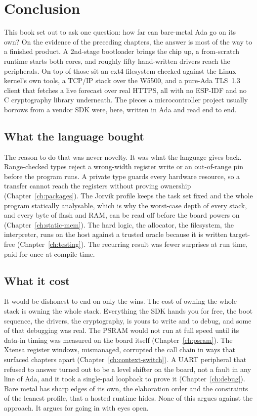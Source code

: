 \chapter*{Conclusion}
\label{ch:conclusion}

This book set out to ask one question: how far can bare-metal Ada go on its own? On
the evidence of the preceding chapters, the answer is most of the way to a finished
product. A 2nd-stage bootloader brings the chip up, a from-scratch runtime starts
both cores, and roughly fifty hand-written drivers reach the peripherals. On top of
those sit an ext4 filesystem checked against the Linux kernel's own tools, a TCP/IP
stack over the W5500, and a pure-Ada TLS~1.3 client that fetches a live forecast over
real HTTPS, all with no ESP-IDF and no C cryptography library underneath. The pieces
a microcontroller project usually borrows from a vendor SDK were, here, written in
Ada and read end to end.

\section*{What the language bought}

The reason to do that was never novelty. It was what the language gives back.
Range-checked types reject a wrong-width register write or an out-of-range pin before
the program runs. A private type guards every hardware resource, so a transfer cannot
reach the registers without proving ownership (Chapter~\ref{ch:packages}). The Jorvik
profile keeps the task set fixed and the whole program statically analysable, which
is why the worst-case depth of every stack, and every byte of flash and RAM, can be
read off before the board powers on (Chapter~\ref{ch:static-mem}). The hard logic,
the allocator, the filesystem, the interpreter, runs on the host against a trusted
oracle because it is written target-free (Chapter~\ref{ch:testing}). The recurring
result was fewer surprises at run time, paid for once at compile time.

\section*{What it cost}

It would be dishonest to end on only the wins. The cost of owning the whole stack is
owning the whole stack. Everything the SDK hands you for free, the boot sequence, the
drivers, the cryptography, is yours to write and to debug, and some of that debugging
was real. The PSRAM would not run at full speed until its data-in timing was measured
on the board itself (Chapter~\ref{ch:psram}). The Xtensa register windows,
mismanaged, corrupted the call chain in ways that surfaced chapters apart
(Chapter~\ref{ch:context-switch}). A UART peripheral that refused to answer turned out
to be a level shifter on the board, not a fault in any line of Ada, and it took a
single-pad loopback to prove it (Chapter~\ref{ch:debug}). Bare metal has sharp edges
of its own, the elaboration order and the constraints of the leanest profile, that a
hosted runtime hides. None of this argues against the approach. It argues for going
in with eyes open.

